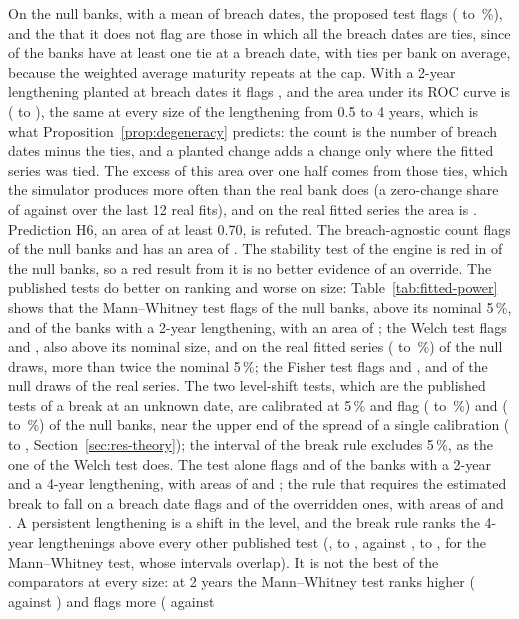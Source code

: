 On the null banks, with a mean of \fitMeanM{} breach dates, the proposed test flags \fitNullEngine{} (\fitNullLoEngine{} to \fitNullHiEngine{}\,\%), and the \fitNullZero{} that it does not flag are those in which all the breach dates are ties, since \tieBanks{} of the banks have at least one tie at a breach date, with \tieMean{} ties per bank on average, because the weighted average maturity repeats at the cap. With a 2-year lengthening planted at breach dates it flags \fitAddCEngine{}, and the area under its ROC curve is \fitAucCEngine{} (\fitAucLoCEngine{} to \fitAucHiCEngine{}), the same at every size of the lengthening from 0.5 to 4 years, which is what Proposition~\ref{prop:degeneracy} predicts: the count is the number of breach dates minus the ties, and a planted change adds a change only where the fitted series was tied. The excess of this area over one half comes from those ties, which the simulator produces more often than the real bank does (a zero-change share of \simZero{} against \realZeroLast{} over the last 12 real fits), and on the real fitted series the area is \realEngineAuc{}. Prediction H6, an area of at least 0.70, is refuted. The breach-agnostic count flags \fitNullAny{} of the null banks and has an area of \fitAucCAny{}. The stability test of the engine is red in \fitNullStab{} of the null banks, so a red result from it is no better evidence of an override. The published tests do better on ranking and worse on size: Table~\ref{tab:fitted-power} shows that the Mann--Whitney test flags \fitNullMw{} of the null banks, above its nominal 5\,\%, and \fitAddCMw{} of the banks with a 2-year lengthening, with an area of \fitAucCMw{}; the Welch test flags \fitNullWelch{} and \fitAddCWelch{}, also above its nominal size, and on the real fitted series \realNullWelch{} (\realNullLoWelch{} to \realNullHiWelch{}\,\%) of the null draws, more than twice the nominal 5\,\%; the Fisher test flags \fitNullFisher{} and \fitAddCFisher{}, and \realNullFisher{} of the null draws of the real series. The two level-shift tests, which are the published tests of a break at an unknown date, are calibrated at 5\,\% and flag \fitNullShift{} (\fitNullLoShift{} to \fitNullHiShift{}\,\%) and \fitNullShiftB{} (\fitNullLoShiftB{} to \fitNullHiShiftB{}\,\%) of the null banks, near the upper end of the spread of a single calibration (\confLo{} to \confHi{}, Section~\ref{sec:res-theory}); the interval of the break rule excludes 5\,\%, as the one of the Welch test does. The test alone flags \fitAddCShift{} and \fitAddDShift{} of the banks with a 2-year and a 4-year lengthening, with areas of \fitAucCShift{} and \fitAucDShift{}; the rule that requires the estimated break to fall on a breach date flags \fitAddCShiftB{} and \fitAddDShiftB{} of the overridden ones, with areas of \fitAucCShiftB{} and \fitAucDShiftB{}. A persistent lengthening is a shift in the level, and the break rule ranks the 4-year lengthenings above every other published test (\fitAucDShiftB{}, \fitAucLoDShiftB{} to \fitAucHiDShiftB{}, against \fitAucDMw{}, \fitAucLoDMw{} to \fitAucHiDMw{}, for the Mann--Whitney test, whose intervals overlap). It is not the best of the comparators at every size: at 2 years the Mann--Whitney test ranks higher (\fitAucCMw{} against \fitAucCShiftB{}) and flags more (\fitAddCMw{} against 